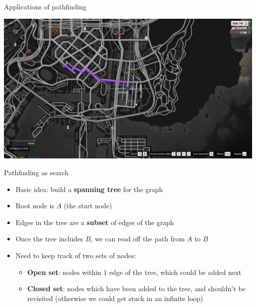 \begin{frame}{Applications of pathfinding}
    \begin{center}
        \includegraphics[width=\textwidth]{image7}
    \end{center}
\end{frame}

\begin{frame}{Pathfinding as search}
    \begin{itemize}
        \pause\item Basic idea: build a \textbf{spanning tree} for the graph
        \pause\item Root node is $A$ (the start node)
        \pause\item Edges in the tree are a \textbf{subset} of edges of the graph
        \pause\item Once the tree includes $B$, we can read off the path from $A$ to $B$
        \pause\item Need to keep track of two sets of nodes:
            \begin{itemize}
                \pause\item \textbf{Open set}: nodes within 1 edge of the tree, which could be added next
                \pause\item \textbf{Closed set}: nodes which have been added to the tree, and shouldn't be revisited
                    (otherwise we could get stuck in an infinite loop)
            \end{itemize}
    \end{itemize}
\end{frame}


